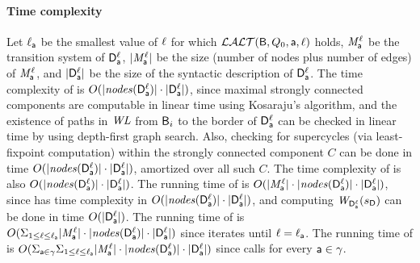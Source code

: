 \paragraph{Time complexity} 
Let 
$\ell_{\mathsf{a}}$ be the smallest value of $\ell$ for which  $\mathcal{LALT}(\mathsf{B}, Q_0, \mathsf{a}, \ell)$ holds, 
$\mathit{M}_{\mathsf{a}}^{\ell}$ be the transition system of $\mathsf{D}_{\mathsf{a}}^{\ell}$, 
$|\mathit{M}_{\mathsf{a}}^{\ell}|$ be the size (number of nodes plus number of edges) of $\mathit{M}_{\mathsf{a}}^{\ell}$, and
$|\mathsf{D}_{\mathsf{a}}^{\ell}|$ be the size of the syntactic description of $\mathsf{D}_{\mathsf{a}}^{\ell}$.
%
The time complexity of  is $O(|\mathit{nodes}(\mathsf{D}_{\mathsf{a}}^{\ell})| \cdot |\mathsf{D}_{\mathsf{a}}^{\ell}|)$, since maximal strongly connected components
are computable in linear time using Kosaraju's algorithm, and the existence of paths in $\mathit{WL}$ from $\mathsf{B}_i$ to the border of $\mathsf{D}_{\mathsf{a}}^{\ell}$ can be checked in linear time by 
using depth-first graph search. Also, checking for supercycles (via least-fixpoint computation) within the strongly connected component $C$ can be done in time 
$O(|\mathit{nodes}(\mathsf{D}_{\mathsf{a}}^{\ell})| \cdot |\mathsf{D}_{\mathsf{a}}^{\ell}|)$, amortized over all such $C$.
%
The time complexity of  is also $O(|\mathit{nodes}(\mathsf{D}_{\mathsf{a}}^{\ell})| \cdot |\mathsf{D}_{\mathsf{a}}^{\ell}|)$.
%
The running time of  is $O(|\mathit{M}_{\mathsf{a}}^{\ell}| \cdot |\mathit{nodes}(\mathsf{D}_{\mathsf{a}}^{\ell})| \cdot |\mathsf{D}_{\mathsf{a}}^{\ell}|)$,
since \cLFP{$\dsks{\act}{\l}, \sD$} has time complexity in $O(|\mathit{nodes}(\mathsf{D}_{\mathsf{a}}^{\ell})| \cdot |\mathsf{D}_{\mathsf{a}}^{\ell}|)$, and computing 
$\mathit{W}_{\mathsf{D}_{\mathsf{a}}^{\ell}}({s_\mathsf{D}})$ can be done in time $O(|\mathsf{D}_{\mathsf{a}}^{\ell}|)$.
%
The running time of  is $O(\Sigma_{1 \le \ell \le \ell_{\mathsf{a}}} |\mathit{M}_{\mathsf{a}}^{\ell}| \cdot |\mathit{nodes}(\mathsf{D}_{\mathsf{a}}^{\ell})| \cdot |\mathsf{D}_{\mathsf{a}}^{\ell}|)$
since  iterates  until $\ell = \ell_{\mathsf{a}}$.
%
The running  time of  is
$O(\Sigma_{\mathsf{a} \in \gamma}  \Sigma_{1 \le \ell \le \ell_{\mathsf{a}}} |\mathit{M}_{\mathsf{a}}^{\ell}| \cdot |\mathit{nodes}(\mathsf{D}_{\mathsf{a}}^{\ell})| \cdot |\mathsf{D}_{\mathsf{a}}^{\ell}|)$
since  calls  for every $\mathsf{a} \in \gamma$.







